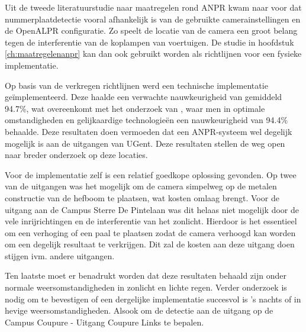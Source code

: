 Uit de tweede literatuurstudie naar maatregelen rond ANPR kwam naar voor dat nummerplaatdetectie vooral afhankelijk is van de gebruikte camerainstellingen en de OpenALPR configuratie. Zo speelt de locatie van de camera een groot belang tegen de interferentie van de koplampen van voertuigen. De studie in hoofdstuk \ref{ch:maatregelenanpr} kan dan ook gebruikt worden als richtlijnen voor een fysieke implementatie.

Op basis van de verkregen richtlijnen werd een technische implementatie geïmplementeerd. Deze haalde een verwachte nauwkeurigheid van gemiddeld 94.7\%, wat overeenkomt met het onderzoek van \textcite{figuerola2016automated}, waar men in optimale omstandigheden en gelijkaardige technologieën een nauwkeurigheid van 94.4\% behaalde. Deze resultaten doen vermoeden dat een ANPR-systeem wel degelijk mogelijk is aan de uitgangen van UGent. Deze resultaten stellen de weg open naar breder onderzoek op deze locaties.

Voor de implementatie zelf is een relatief goedkope oplossing gevonden. Op twee van de uitgangen was het mogelijk om de camera simpelweg op de metalen constructie van de hefboom te plaatsen, wat kosten omlaag brengt. Voor de uitgang aan de Campus Sterre De Pintelaan was dit helaas niet mogelijk door de vele inrijrichtingen en de interferentie van het zonlicht. Hierdoor is het essentieel om een verhoging of een paal te plaatsen zodat de camera verhoogd kan worden om een degelijk resultaat te verkrijgen. Dit zal de kosten aan deze uitgang doen stijgen ivm. andere uitgangen.

Ten laatste moet er benadrukt worden dat deze resultaten behaald zijn onder normale weersomstandigheden in zonlicht en lichte regen. Verder onderzoek is nodig om te bevestigen of een dergelijke implementatie succesvol is 's nachts of in hevige weersomstandigheden. Alsook om de detectie aan de uitgang op de Campus Coupure - Uitgang Coupure Links te bepalen.
